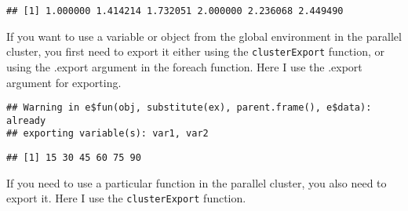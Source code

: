 \documentclass[]{article}
\newenvironment{Shaded}{\begin{snugshade}}{\end{snugshade}}
\newcommand{\KeywordTok}[1]{\textcolor[rgb]{0.13,0.29,0.53}{\textbf{#1}}}
\newcommand{\DataTypeTok}[1]{\textcolor[rgb]{0.13,0.29,0.53}{#1}}
\newcommand{\DecValTok}[1]{\textcolor[rgb]{0.00,0.00,0.81}{#1}}
\newcommand{\StringTok}[1]{\textcolor[rgb]{0.31,0.60,0.02}{#1}}
\newcommand{\ControlFlowTok}[1]{\textcolor[rgb]{0.13,0.29,0.53}{\textbf{#1}}}
\newcommand{\OperatorTok}[1]{\textcolor[rgb]{0.81,0.36,0.00}{\textbf{#1}}}
\newcommand{\NormalTok}[1]{#1}
\begin{document}
\begin{verbatim}
## [1] 1.000000 1.414214 1.732051 2.000000 2.236068 2.449490
\end{verbatim}

If you want to use a variable or object from the global environment in
the parallel cluster, you first need to export it either using the
\texttt{clusterExport} function, or using the .export argument in the
foreach function. Here I use the .export argument for exporting.

\begin{Shaded}
\end{Shaded}

\begin{verbatim}
## Warning in e$fun(obj, substitute(ex), parent.frame(), e$data): already
## exporting variable(s): var1, var2
\end{verbatim}

\begin{verbatim}
## [1] 15 30 45 60 75 90
\end{verbatim}

If you need to use a particular function in the parallel cluster, you
also need to export it. Here I use the \texttt{clusterExport} function.

\begin{Shaded}
\end{Shaded}
\end{document}
